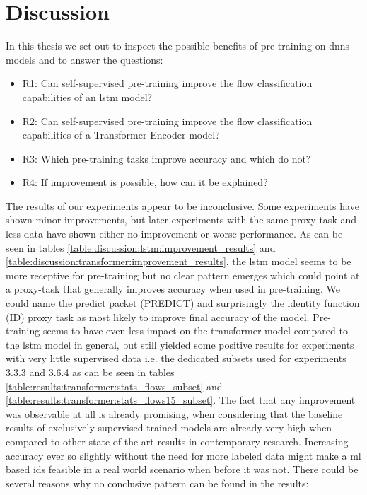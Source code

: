 \chapter{Discussion} \label{sec:discussion}

In this thesis we set out to inspect the possible benefits of pre-training on \glspl{dnn} models and to answer the questions:

\begin{itemize}
	\item R1: Can self-supervised pre-training improve the flow classification capabilities of an \gls{lstm} model?
	\item R2: Can self-supervised pre-training improve the flow classification capabilities of a Transformer-Encoder model?
	\item R3: Which pre-training tasks improve accuracy and which do not?
	\item R4: If improvement is possible, how can it be explained?
\end{itemize}

The results of our experiments appear to be inconclusive. Some experiments have shown minor improvements, but later experiments with the same proxy task and less data have shown either no improvement or worse performance. As can be seen in tables \ref{table:discussion:lstm:improvement_results} and \ref{table:discussion:transformer:improvement_results}, the \gls{lstm} model seems to be more receptive for pre-training but no clear pattern emerges which could point at a proxy-task that generally improves accuracy when used in pre-training. We could name the predict packet (PREDICT) and surprisingly the identity function (ID) proxy task as most likely to improve final accuracy of the model. Pre-training seems to have even less impact on the transformer model compared to the \gls{lstm} model in general, but still yielded some positive results for experiments with very little supervised data i.e. the dedicated subsets used for experiments 3.3.3 and 3.6.4 as can be seen in tables \ref{table:results:transformer:stats_flows_subset} and \ref{table:results:transformer:stats_flows15_subset}. The fact that any improvement was observable at all is already promising, when considering that the baseline results of exclusively supervised trained models are already very high when compared to other state-of-the-art results in contemporary research. Increasing accuracy ever so slightly without the need for more labeled data might make a \gls{ml} based \gls{ids} feasible in a real world scenario when before it was not. There could be several reasons why no conclusive pattern can be found in the results: \par

